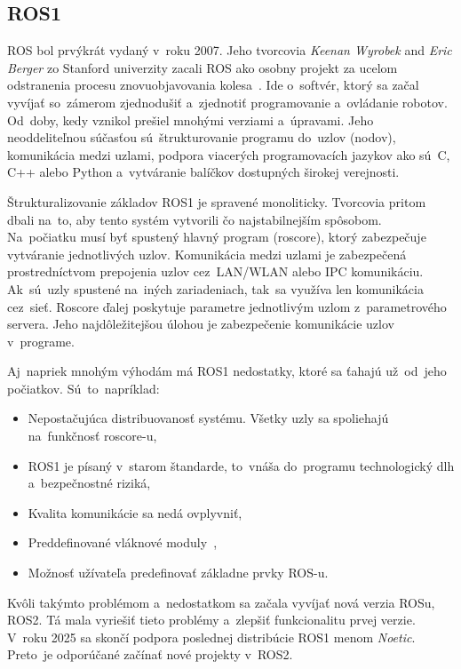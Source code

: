 \subsection{ROS1}
\label{subsec:ros1}

ROS bol prvýkrát vydaný v~roku 2007. Jeho tvorcovia \textit{Keenan Wyrobek} and \textit{Eric Berger} zo Stanford
univerzity zacali ROS ako osobny projekt za ucelom odstranenia procesu znovuobjavovania kolesa~\cite{rosHistory}.
Ide o~softvér, ktorý sa začal vyvíjať so~zámerom zjednodušiť a~zjednotiť programovanie a~ovládanie robotov.
Od~doby, kedy vznikol prešiel mnohými verziami a~úpravami. Jeho neoddeliteľnou súčasťou sú~štrukturovanie programu
do~uzlov (nodov), komunikácia medzi uzlami, podpora viacerých programovacích jazykov ako sú~C, C++ alebo Python
a~vytváranie balíčkov dostupných širokej verejnosti.

Štrukturalizovanie základov ROS1 je spravené monoliticky. Tvorcovia pritom dbali na~to, aby tento
systém vytvorili čo najstabilnejším spôsobom. Na~počiatku musí byť spustený hlavný program (roscore),
ktorý zabezpečuje vytváranie jednotlivých uzlov. Komunikácia medzi uzlami je zabezpečená prostredníctvom
prepojenia uzlov cez~LAN/WLAN alebo IPC komunikáciu. Ak~sú~uzly spustené na~iných zariadeniach,
tak~sa využíva len komunikácia cez~sieť. Roscore ďalej poskytuje parametre jednotlivým uzlom
z~parametrového servera. Jeho najdôležitejšou úlohou je zabezpečenie komunikácie uzlov v~programe.

\clearpage

Aj~napriek mnohým výhodám má ROS1 nedostatky, ktoré sa ťahajú už~od~jeho počiatkov. Sú~to~napríklad:

\begin{itemize}
	\item Nepostačujúca distribuovanosť systému. Všetky uzly sa spoliehajú na~funkčnosť roscore-u,
	\item ROS1 je písaný v~starom štandarde, to~vnáša do~programu technologický dlh a~bezpečnostné riziká,
	\item Kvalita komunikácie sa nedá ovplyvniť,
	\item Preddefinované vláknové moduly~\cite{ROS2design},
	\item Možnosť užívateľa predefinovať základne prvky ROS-u.
\end{itemize}

Kvôli takýmto problémom a~nedostatkom sa začala vyvíjať nová verzia ROSu, ROS2. Tá mala vyriešiť tieto problémy a~zlepšiť funkcionalitu
prvej verzie. V~roku 2025 sa skončí podpora poslednej distribúcie ROS1 menom \textit{Noetic}. Preto~je odporúčané začínať nové projekty
v~ROS2.

